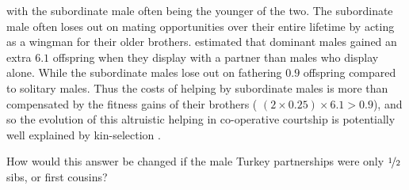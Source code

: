 with the subordinate male often being the younger of the two. The
subordinate male often loses out on mating opportunities over their
entire lifetime by acting as a wingman for their older 
brothers. \citet{krakauer2005kin} estimated that dominant males gained
an extra $6.1$ offspring when they display with a partner than males
who display alone. While the subordinate males lose out on fathering $0.9$
offspring compared to solitary males. Thus the costs of helping by
subordinate males is more than compensated by the fitness gains of
their brothers ( $ (2 \times 0.25)  \times 6.1 > 0.9$), and so the
evolution of this  altruistic  helping in co-operative courtship is potentially well explained by kin-selection \citep[see ][for more analysis]{akccay2016}.
\begin{question}
How would this answer be changed if the male Turkey partnerships were only
$\nicefrac{1}{2}$ sibs, or first cousins?
\end{question}


